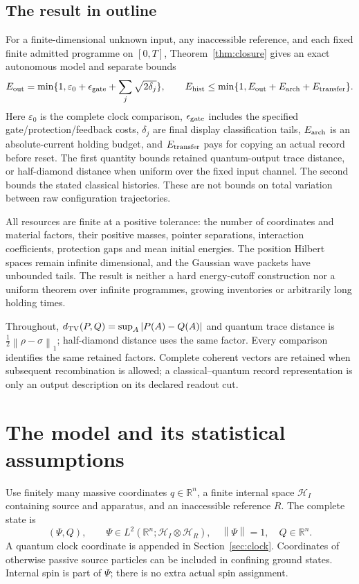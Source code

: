 \documentclass[11pt]{article}
\theoremstyle{definition}\newtheorem{assumption}[theorem]{Constitutive assumption}
\theoremstyle{remark}\newtheorem{remark}[theorem]{Remark}
\newcommand{\cH}{\mathcal H}\newcommand{\cS}{\mathcal S}
\newcommand{\norm}[1]{\left\|#1\right\|}\newcommand{\pos}[1]{[#1]_+}
\begin{document}
\subsection{The result in outline}
For a finite-dimensional unknown input, any inaccessible reference, and each fixed finite admitted programme on $[0,T]$, Theorem~\ref{thm:closure} gives an exact autonomous model and separate bounds
\[
 E_{\rm out}=\min\{1,\varepsilon_0+\epsilon_{\rm gate}
                  +\sum_j\sqrt{2\delta_j}\},\qquad
 E_{\rm hist}\le\min\{1,E_{\rm out}+E_{\rm arch}+E_{\rm transfer}\}.
\]
Here $\varepsilon_0$ is the complete clock comparison, $\epsilon_{\rm gate}$ includes the specified gate/protection/feedback costs, $\delta_j$ are final display classification tails, $E_{\rm arch}$ is an absolute-current holding budget, and $E_{\rm transfer}$ pays for copying an actual record before reset. The first quantity bounds retained quantum-output trace distance, or half-diamond distance when uniform over the fixed input channel. The second bounds the stated classical histories. These are not bounds on total variation between raw configuration trajectories.

All resources are finite at a positive tolerance: the number of coordinates and material factors, their positive masses, pointer separations, interaction coefficients, protection gaps and mean initial energies. The position Hilbert spaces remain infinite dimensional, and the Gaussian wave packets have unbounded tails. The result is neither a hard energy-cutoff construction nor a uniform theorem over infinite programmes, growing inventories or arbitrarily long holding times.

Throughout, $d_{\rm TV}(P,Q)=\sup_A|P(A)-Q(A)|$ and quantum trace distance is $\frac12\norm{\rho-\sigma}_1$; half-diamond distance uses the same factor. Every comparison identifies the same retained factors. Complete coherent vectors are retained when subsequent recombination is allowed; a classical--quantum record representation is only an output description on its declared readout cut.

\section{The model and its statistical assumptions}
\label{sec:constitution}
Use finitely many massive coordinates $q\in\mathbb R^n$, a finite internal space $\cH_I$ containing source and apparatus, and an inaccessible reference $R$. The complete state is
\begin{equation}\label{eq:state}
 (\Psi,Q),\qquad \Psi\in L^2(\mathbb R^n;\cH_I\otimes\cH_R),\quad
 \norm{\Psi}=1,\quad Q\in\mathbb R^n.
\end{equation}
A quantum clock coordinate is appended in Section~\ref{sec:clock}. Coordinates of otherwise passive source particles can be included in confining ground states. Internal spin is part of $\Psi$; there is no extra actual spin assignment.
\end{document}
